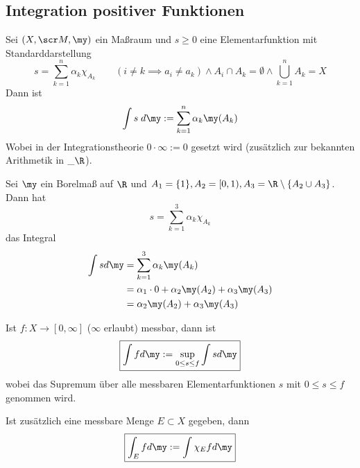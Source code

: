\documentclass[a4paper,10pt]{scrartcl}
\begin{document}
\subsection{Integration positiver Funktionen}

\begin{df*}
	Sei $(X,\scr M, \my)$ ein Maßraum und $s\ge 0$ eine Elementarfunktion mit Standarddarstellung
	\[
		s=\sum_{k=1}^n \alpha_k \chi_{A_k} \qquad (i\neq k \implies a_i\neq a_k) \land A_i\cap A_k =\emptyset \land \bigcup_{k=1}^nA_k = X
	\]
	Dann ist
	\[
		\int s\;d\my := \sum_{k=1}^n \alpha_k \my(A_k)
	\]
	Wobei in der Integrationstheorie $0\cdot \infty := 0$ gesetzt wird (zusätzlich zur bekannten Arithmetik in $\_\R$).
\end{df*}


\begin{ex*}
	Sei $\my$ ein Borelmaß auf $\R$ und $A_1 = \{1\}, A_2 = [0,1), A_3 = \R\setminus \{A_2\cup A_3\}$.
	Dann hat
	\[
		s= \sum_{k=1}^3 \alpha_k \chi_{A_k}
	\]
	das Integral
	\begin{align*}
		\int s d\my &= \sum_{k=1}^3 \alpha_k \my(A_k)\\
											   &= \alpha_1\cdot 0  + \alpha_2 \my(A_2) + \alpha_3 \my(A_3)\\
										 &= \alpha_2\my(A_2) + \alpha_3 \my(A_3)
	\end{align*}
\end{ex*}

\begin{df*}
	Ist $f:X\to [0,\infty]$ ($\infty$ erlaubt) messbar, dann ist
	\[\boxed{
		\int f d\my := \sup_{0\le s\le f} \int s d\my
	}\]
	wobei das Supremum über alle messbaren Elementarfunktionen $s$ mit $0\le s\le f$ genommen wird.

	Ist zusätzlich eine messbare Menge $E\subset X$ gegeben, dann
	\[\boxed{
		\int_E f d\my := \int \chi_E f d\my
	}\]
\end{df*}
\end{document}
